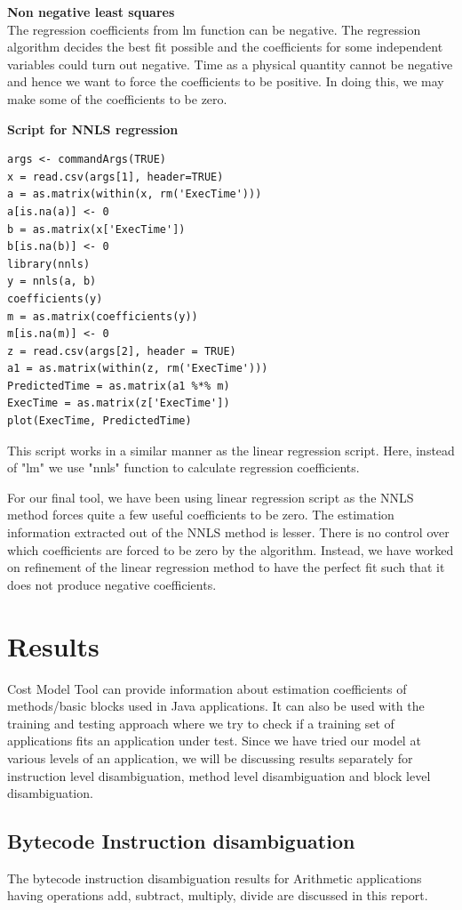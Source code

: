 \documentclass[11pt]{article}
\begin{document}
\textbf{Non negative least squares}\\

The regression coefficients from lm function can be negative. The regression algorithm decides the best fit possible and the coefficients for some independent variables could turn out negative.\citep{nnls} Time as a physical quantity cannot be negative and hence we want to force the coefficients to be positive. In doing this, we may make some of the coefficients to be zero.

\textbf{Script for NNLS regression}

\begin{lstlisting}
args <- commandArgs(TRUE)
x = read.csv(args[1], header=TRUE)
a = as.matrix(within(x, rm('ExecTime')))
a[is.na(a)] <- 0
b = as.matrix(x['ExecTime'])
b[is.na(b)] <- 0
library(nnls)
y = nnls(a, b)
coefficients(y)
m = as.matrix(coefficients(y))
m[is.na(m)] <- 0
z = read.csv(args[2], header = TRUE)
a1 = as.matrix(within(z, rm('ExecTime')))
PredictedTime = as.matrix(a1 %*% m)
ExecTime = as.matrix(z['ExecTime'])
plot(ExecTime, PredictedTime)
\end{lstlisting}

This script works in a similar manner as the linear regression script. Here, instead of "lm" we use "nnls" function to calculate regression coefficients.

For our final tool, we have been using linear regression script as the NNLS method forces quite a few useful coefficients to be zero. The estimation information extracted out of the NNLS method is lesser. There is no control over which coefficients are forced to be zero by the algorithm. Instead, we have worked on refinement of the linear regression method to have the perfect fit such that it does not produce negative coefficients.
\newpage

\section{Results}
Cost Model Tool can provide information about estimation coefficients of methods/basic blocks used in Java applications. It can also be used with the training and testing approach where we try to check if a training set of applications fits an application under test. Since we have tried our model at various levels of an application, we will be discussing results separately for instruction level disambiguation, method level disambiguation and block level disambiguation.

\subsection{Bytecode Instruction disambiguation}
The bytecode instruction disambiguation results for Arithmetic applications having operations add, subtract, multiply, divide are discussed in this report.
\end{document}
